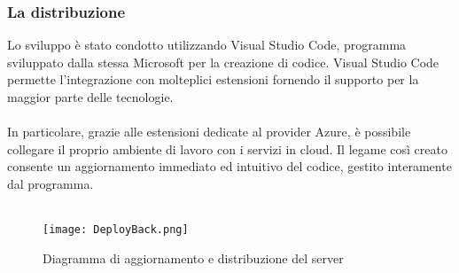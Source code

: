 \clearpage

\subsubsection{La distribuzione}
Lo sviluppo è stato condotto utilizzando Visual Studio Code, 
programma sviluppato dalla stessa Microsoft per la creazione di codice.
Visual Studio Code permette l'integrazione con molteplici estensioni fornendo il supporto
per la maggior parte delle tecnologie.\\
\\
In particolare, grazie alle estensioni dedicate al provider Azure, 
è possibile collegare il proprio ambiente di lavoro con i servizi in cloud.
Il legame così creato consente un aggiornamento immediato ed intuitivo del codice, 
gestito interamente dal programma.\\
\\
\begin{figure}[h!]
    \begin{center}
        \texttt{[image: DeployBack.png]}
        \caption{Diagramma di aggiornamento e distribuzione del server}
    \end{center}
\end{figure}

\clearpage

